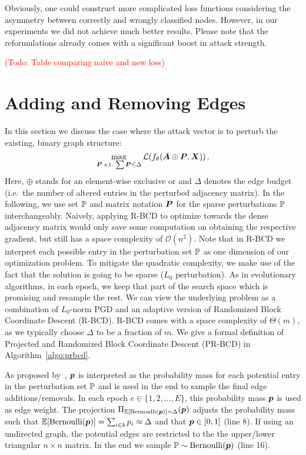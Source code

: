 \documentclass[sigconf,authordraft]{acmart}
\newcommand{\adj}{\mA}
\newcommand{\features}{\mX}
\newcommand{\todo}[1]{\textcolor{red}{(Todo: #1)}}
\begin{document}
Obviously, one could construct more complicated loss functions considering the asymmetry between correctly and wrongly classified nodes. However, in our experiments we did not achieve much better results. Please note that the reformulations already comes with a significant boost in attack strength.

\todo{Table comparing naive and new loss}

\section{Adding and Removing Edges}\label{sec:prbcd}

In this section we discuss the case where the attack vector is to perturb the existing, binary graph structure:
%
\begin{equation}\label{eq:pgd}
  \max_{\mP\,\,\text{s.t.}\, \sum \mP \le \Delta} \mathcal{L}(f_{\theta}(\adj \oplus \mP, \features))\,.
\end{equation}
%
Here, \(\oplus\) stands for an element-wise exclusive or and \(\Delta\) denotes the edge budget (i.e.\ the number of altered entries in the perturbed adjacency matrix). In the following, we use set \({\mathbb{P}}\) and matrix notation \({\bm{P}}\) for the sparse perturbations \({\mathbb{P}}\) interchangeably. Naively, applying R-BCD to optimize towards the dense adjacency matrix would only save some computation on obtaining the respective gradient, but still has a space complexity of \(\mathcal{O}(n^2)\). Note that in R-BCD we interpret each possible entry in the perturbation set \({\mathbb{P}}\) as one dimension of our optimization problem. To mitigate the quadratic complexity, we make use of the fact that the solution is going to be sparse (\(L_0\) perturbation). As in evolutionary algorithms, in each epoch, we keep that part of the search space which is promising and resample the rest. We can view the underlying problem as a combination of \(L_0\)-norm PGD and an adaptive version of Randomized Block Coordinate Descent (R-BCD). R-BCD comes with a space complexity of \(\Theta(m)\), as we typically choose \(\Delta\) to be a fraction of \(m\). We give a formal definition of Projected and Randomized Block Coordinate Descent (PR-BCD) in Algorithm~\ref{algo:prbcd}.

As proposed by~\citet{Xu2019a}, \({\bm{p}}\) is interpreted as the probability mass for each potential entry in the perturbation set \({\mathbb{P}}\) and is used in the end to sample the final edge additions/removals. In each epoch \(e \in \{1,2, \dots, E\}\), this probability mass \({\bm{p}}\) is used as edge weight. The projection \(\Pi_{\mathbb{E}[\text{Bernoulli}({\bm{p}})] = \Delta} ({\bm{p}})\) adjusts the probability mass such that \(\mathbb{E}[\text{Bernoulli}({\bm{p}})] = \sum_{i \in b} {p}_i \approx \Delta\) and that \({\bm{p}} \in [0, 1]\) (line 8). If using an undirected graph, the potential edges are restricted to the the upper/lower triangular \(n \times n\) matrix. In the end we sample \({\mathbb{P}} \sim \text{Bernoulli}({\bm{p}})\) (line 16).
\end{document}
